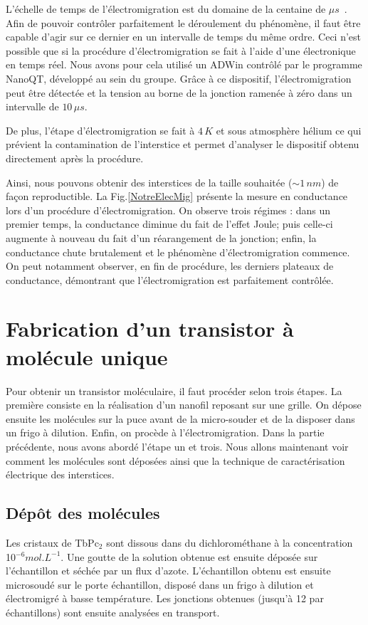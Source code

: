 L'échelle de temps de l'électromigration est du domaine de la centaine de $\mu s$~\cite{ONeill2007}. Afin de pouvoir contrôler parfaitement le déroulement du phénomène, il faut être capable d'agir sur ce dernier en un intervalle de temps du même ordre. Ceci n'est possible que si la procédure d'électromigration se fait à l'aide d'une électronique en temps réel. Nous avons pour cela utilisé un ADWin contrôlé par le programme NanoQT, développé au sein du groupe. Grâce à ce dispositif, l'électromigration peut être détectée et la tension au borne de la jonction ramenée à zéro dans un intervalle de $10\, \mu s$.

De plus, l'étape d'électromigration se fait à $4\,K$ et sous atmosphère hélium ce qui prévient la contamination de l'interstice et permet d'analyser le dispositif obtenu directement après la procédure.

Ainsi, nous pouvons obtenir des interstices de la taille souhaitée ($\sim 1\,nm$) de façon reproductible. La Fig.\ref{NotreElecMig} présente la mesure en conductance lors d'un procédure d'électromigration. On observe trois régimes : dans un premier temps, la conductance diminue du fait de l'effet Joule; puis celle-ci augmente à nouveau du fait d'un réarangement de la jonction; enfin, la conductance chute brutalement et le phénomène d'électromigration commence. On peut notamment observer, en fin de procédure, les derniers plateaux de conductance, démontrant que l'électromigration est parfaitement contrôlée.


\section{Fabrication d'un transistor à molécule unique}
Pour obtenir un transistor moléculaire, il faut procéder selon trois étapes. La première consiste en la réalisation d'un nanofil reposant sur une grille. On dépose ensuite les molécules sur la puce avant de la micro-souder et de la disposer dans un frigo à dilution. Enfin, on procède à l'électromigration. Dans la partie précédente, nous avons abordé l'étape un et trois. Nous allons maintenant voir comment les molécules sont déposées ainsi que la technique de caractérisation électrique des interstices.

\subsection{Dép\^ot des molécules}
Les cristaux de TbPc$_{2}$ sont dissous dans du dichlorométhane à la concentration 10$^{-6}mol.L^{-1}$. Une goutte de la solution obtenue est ensuite déposée sur l'échantillon et séchée par un flux d'azote. L'échantillon obtenu est ensuite microsoudé sur le porte échantillon, disposé dans un frigo à dilution et électromigré à basse température. Les jonctions obtenues (jusqu'à 12 par échantillons) sont ensuite analysées en transport.

